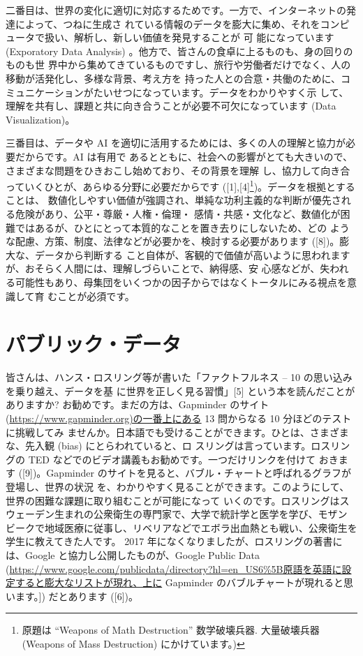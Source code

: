 \documentclass[
]{book}
\theoremstyle{definition}
\theoremstyle{definition}
\theoremstyle{definition}
\theoremstyle{definition}
\theoremstyle{remark}
\begin{document}
二番目は、世界の変化に適切に対応するためです。一方で、インターネットの発達によって、つねに生成さ れている情報のデータを膨大に集め、それをコンピュータで扱い、解析し、新しい価値を発見することが 可 能になっています (Exporatory Data Analysis) 。他方で、皆さんの食卓に上るものも、身の回りのものも世
界中から集めてきているものですし、旅行や労働者だけでなく、人の移動が活発化し、多様な背景、考え方を 持った人との合意・共働のために、コミュニケーションがたいせつになっています。データをわかりやすく示 して、理解を共有し、課題と共に向き合うことが必要不可欠になっています (Data Visualization)。

三番目は、データや AI を適切に活用するためには、多くの人の理解と協力が必要だからです。AI は有用で あるとともに、社会への影響がとても大きいので、さまざまな問題をひきおこし始めており、その背景を理解 し、協力して向き合っていくひとが、あらゆる分野に必要だからです ({[}1{]},{[}4{]}\footnote{ 原題は ``Weapons of Math Destruction'' 数学破壊兵器. 大量破壊兵器 (Weapons of Mass Destruction) にかけています。)})。データを根拠とすることは、 数値化しやすい価値が強調され、単純な功利主義的な判断が優先される危険があり、公平・尊厳・人権・倫理・ 感情・共感・文化など、数値化が困難ではあるが、ひとにとって本質的なことを置き去りにしないため、どの ような配慮、方策、制度、法律などが必要かを、検討する必要があります ({[}8{]})。膨大な、データから判断する こと自体が、客観的で価値が高いように思われますが、おそらく人間には、理解しづらいことで、納得感、安 心感などが、失われる可能性もあり、母集団をいくつかの因子からではなくトータルにみる視点を意識して育 むことが必須です。

\hypertarget{ux30d1ux30d6ux30eaux30c3ux30afux30c7ux30fcux30bf}{%
\section{パブリック・データ}\label{ux30d1ux30d6ux30eaux30c3ux30afux30c7ux30fcux30bf}}

皆さんは、ハンス・ロスリング等が書いた「ファクトフルネス -- 10 の思い込みを乗り越え、データを基 に世界を正しく見る習慣」{[}5{]} という本を読んだことがありますか? お勧めです。まだの方は、Gapminder のサイト(\url{https://www.gapminder.org)の一番上にある} 13 問からなる 10 分ほどのテストに挑戦してみ ませんか。日本語でも受けることができます。ひとは、さまざまな、先入観 (bias) にとらわれていると、ロ スリングは言っています。ロスリングの TED などでのビデオ講義もお勧めです。一つだけリンクを付けて おきます ({[}9{]})。Gapminder のサイトを見ると、バブル・チャートと呼ばれるグラフが登場し、世界の状況 を、わかりやすく見ることができます。このようにして、世界の困難な課題に取り組むことが可能になって いくのです。ロスリングはスウェーデン生まれの公衆衛生の専門家で、大学で統計学と医学を学び、モザン ビークで地域医療に従事し、リベリアなどでエボラ出血熱とも戦い、公衆衛生を学生に教えてきた人です。 2017 年になくなりましたが、ロスリングの著書には、Google と協力し公開したものが、Google Public Data (\url{https://www.google.com/publicdata/directory?hl=en_US6\%5B原語を英語に設定すると膨大なリストが現れ、上に} Gapminder のバブルチャートが現れると思います。{]}) だとあります ({[}6{]})。
\end{document}
